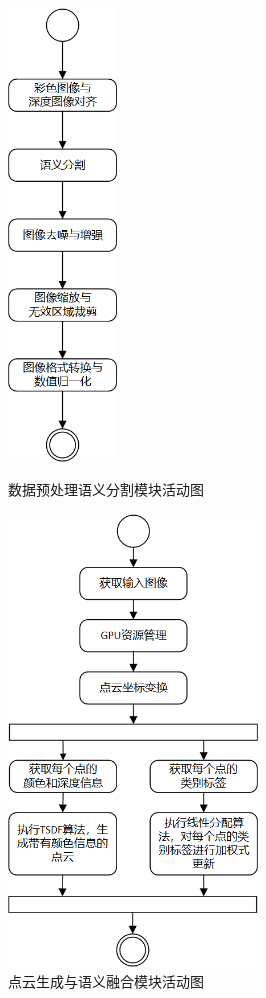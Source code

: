 \begin{figure}[htb]
	\centering
	\begin{minipage}[t]{0.45\linewidth}
		\centering
		\includegraphics[height=12cm,keepaspectratio]{figures/uml/activity3.png}
		\captionsetup{justification=centering}
		\caption{数据预处理语义分割模块活动图}
		\label{fig:activity3}
	\end{minipage}
	\begin{minipage}[t]{0.45\linewidth}
		\centering
		\includegraphics[height=12cm,keepaspectratio]{figures/uml/activity4.png}
		\captionsetup{justification=centering}
		\caption{点云生成与语义融合模块活动图}
		\label{fig:activity4}
	\end{minipage}
\end{figure}


